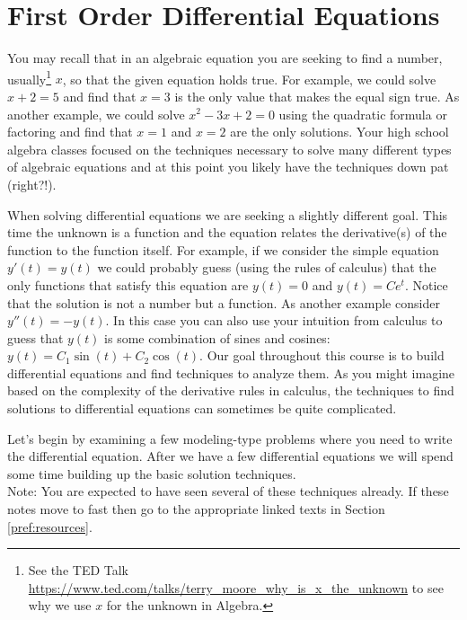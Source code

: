 \chapter{First Order Differential Equations}
You may recall that in an algebraic equation you are seeking to find a number,
usually\footnote{See the TED Talk
    \href{https://www.ted.com/talks/terry_moore_why_is_x_the_unknown}{https://www.ted.com/talks/terry\_moore\_why\_is\_x\_the\_unknown}
to see why we use $x$ for the unknown in Algebra.}
$x$, so that the given equation holds true.  For example, we could solve $x+2 = 5$ and
find that $x=3$ is the only value that makes the equal sign true.  As another example, we
could solve $x^2-3x+2 = 0$ using the quadratic formula or factoring and find that $x=1$
and $x=2$ are the only solutions. Your high school algebra classes focused on the
techniques necessary to solve many different types of algebraic equations and at this
point you likely have the techniques down pat (right?!).

When solving differential equations we are seeking a slightly different goal.  This time
the unknown is a function and the equation relates the derivative(s) of the function to
the function itself.  For example, if we consider the simple equation $y'(t) = y(t)$ we could
probably guess (using the rules of calculus) that the only functions that satisfy this
equation are $y(t) = 0$ and $y(t) = Ce^t$.  Notice that the solution is not a number but a
function.  As another example consider $y''(t) = -y(t)$.  In this case you can also use
your intuition from calculus to guess that $y(t)$ is some combination of sines and
cosines: $y(t) = C_1 \sin(t) + C_2 \cos(t)$. Our goal throughout this course is to build
differential equations and find techniques to analyze them. As you might imagine based on
the complexity of the derivative rules in calculus, the techniques to find solutions to
differential equations can sometimes be quite complicated.

Let's begin by examining a few modeling-type problems where you need to write the
differential equation.  After we have a few differential equations we will spend some time
building up the basic solution techniques. \\
Note: You are expected to have seen several of these techniques already.  If these notes
move to fast then go to the appropriate linked texts in Section \ref{pref:resources}.

